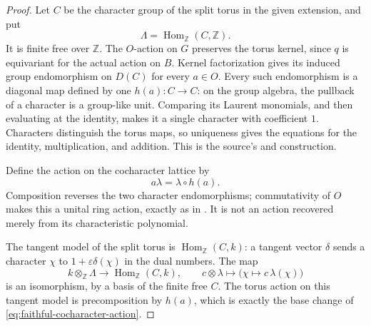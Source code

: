 \begin{proof}
Let \(C\) be the character group of the split torus in the
given extension, and put
\[
                         \Lambda=\operatorname{Hom}_{\mathbb Z}(C,\mathbb Z).
\]
It is finite free over \(\mathbb Z\).
The \(O\)-action on \(G\) preserves the torus kernel, since
\(q\) is equivariant for the actual action on \(B\).
Kernel factorization gives its induced group endomorphism
on \(D(C)\) for every \(a\in O\).
Every such endomorphism is a diagonal map defined by one
\(h(a):C\to C\): on the group algebra, the pullback of a
character is a group-like unit.  Comparing its Laurent
monomials, and then evaluating at the identity, makes it
a single character with coefficient \(1\).
Characters distinguish the torus maps, so uniqueness gives
the equations for the identity, multiplication, and addition.
This is the source's  and
 construction.

Define the action on the cocharacter lattice by
\[
                       a\lambda=\lambda\circ h(a).
 \tag{QL2}\label{eq:faithful-cocharacter-action}
\]
Composition reverses the two character endomorphisms;
commutativity of \(O\) makes this a unital ring action, exactly
as in .  It is not an action recovered merely
from its characteristic polynomial.

The tangent model of the split torus is
\(\operatorname{Hom}_{\mathbb Z}(C,k)\):
a tangent vector \(\delta\) sends a character \(\chi\) to
\(1+\varepsilon\delta(\chi)\) in the dual numbers.
The map
\[
 k\otimes_{\mathbb Z}\Lambda\longrightarrow
             \operatorname{Hom}_{\mathbb Z}(C,k),\qquad
 c\otimes\lambda\longmapsto
             \bigl(\chi\mapsto c\,\lambda(\chi)\bigr)
 \tag{QL3}\label{eq:faithful-cocharacter-tangent}
\]
is an isomorphism, by a basis of the finite free \(C\).
The torus action on this tangent model is precomposition
by \(h(a)\), which is exactly the base change of
\eqref{eq:faithful-cocharacter-action}.


\end{proof}
